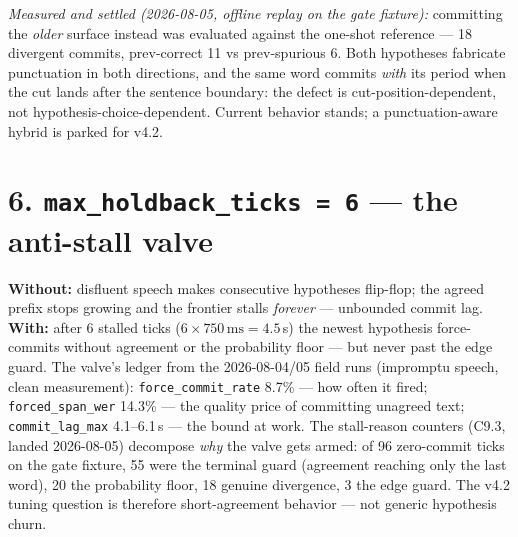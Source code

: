 \documentclass[11pt]{article}
\newcommand{\panelrow}[1]{\node[rowlbl] at (-0.2,0.25) {#1};}
\begin{document}
\emph{Measured and settled (2026-08-05, offline replay on the gate fixture):}
committing the \emph{older} surface instead was evaluated against the one-shot
reference --- 18 divergent commits, prev-correct 11 vs prev-spurious 6. Both
hypotheses fabricate punctuation in both directions, and the same word commits
\emph{with} its period when the cut lands after the sentence boundary: the
defect is cut-position-dependent, not hypothesis-choice-dependent. Current
behavior stands; a punctuation-aware hybrid is parked for v4.2.

\begin{center}
\end{center}

\section*{6. \texttt{max\_holdback\_ticks = 6} --- the anti-stall valve}

\textbf{Without:} disfluent speech makes consecutive hypotheses flip-flop; the
agreed prefix stops growing and the frontier stalls \emph{forever} --- unbounded
commit lag. \textbf{With:} after 6 stalled ticks ($6\times750\,\mathrm{ms} =
4.5$\,s) the newest hypothesis force-commits without agreement or the
probability floor --- but never past the edge guard. The valve's ledger from the
2026-08-04/05 field runs (impromptu speech, clean measurement):
\texttt{force\_commit\_rate} 8.7\% --- how often it fired;
\texttt{forced\_span\_wer} 14.3\% --- the quality price of committing unagreed
text; \texttt{commit\_lag\_max} 4.1--6.1\,s --- the bound at work. The
stall-reason counters (C9.3, landed 2026-08-05) decompose \emph{why} the valve
gets armed: of 96 zero-commit ticks on the gate fixture, 55 were the terminal
guard (agreement reaching only the last word), 20 the probability floor, 18
genuine divergence, 3 the edge guard. The v4.2 tuning question is therefore
short-agreement behavior --- not generic hypothesis churn.
\end{document}
